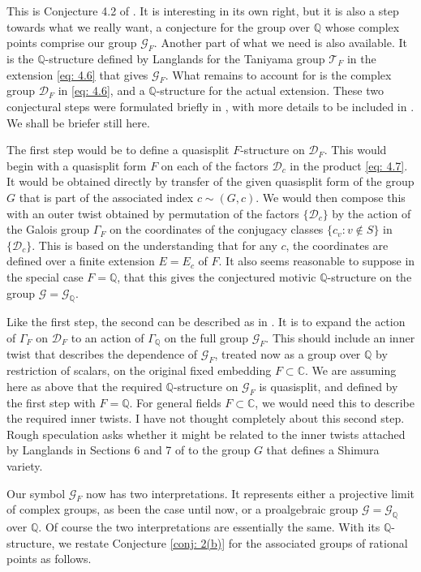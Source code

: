 \documentclass[preprint,12pt, leqno]{elsarticle}
\newcommand{\UGal}{\mathcal{G}_F}
\newcommand{\mQ}{\mathbb{Q}}
\newcommand{\mC}{\mathbb{C}}
\newcommand{\cD}{\mathcal{D}}
\newcommand{\cT}{\mathcal{T}}
\newcommand{\cG}{\mathcal{G}}
\numberwithin{equation}{section}
\theoremstyle{named}
\begin{document}
This is Conjecture 4.2 of \cite{N2}. It is interesting in its own right, but it is also a step towards what we really want, a conjecture for the group over $\mQ$ whose complex points comprise our group $\UGal$. Another part of what we need is also available. It is the $\mQ$-structure defined by Langlands for the Taniyama group $\cT_F$ in the extension \eqref{eq: 4.6} that gives $\UGal$. What remains to account for is the complex group $\cD_F$ in \eqref{eq: 4.6}, and a $\mQ$-structure for the actual extension. These two conjectural steps were formulated briefly in \cite[Section 4]{N2}, with more details to be included in \cite{N14}. We shall be briefer still here.

The first step would be to define a quasisplit $F$-structure on $\cD_F$. This would begin with a quasisplit form $F$ on each of the factors $\cD_c$ in the product \eqref{eq: 4.7}. It would be obtained directly by transfer of the given quasisplit form of the group $G$ that is part of the associated index $c\sim (G, c)$. We would then compose this with an outer twist obtained by permutation of the factors $\{\cD_c\}$ by the action of the Galois group $\Gamma_F$ on the coordinates of the conjugacy classes $\{c_v : v\notin S\}$ in $\{\cD_c\}$. This is based on the understanding that for any $c$, the coordinates are defined over a finite extension $E = E_c$ of $F$. It also seems reasonable to suppose in the special case $F = \mQ$, that this gives the conjectured motivic $\mQ$-structure on the group $\mathcal{G} = \mathcal{G}_{\mQ}$.

Like the first step, the second can be described as in \cite[Section 4]{N2}. It is to expand the action of $\Gamma_F$ on $\cD_F$ to an action of $\Gamma_{\mQ}$ on the full group $\UGal$. This should include an inner twist that describes the dependence of $\UGal$, treated now as a group over $\mQ$ by restriction of scalars,
on the original fixed embedding $F\subset\mC$. We are assuming here as above that the required $\mQ$-structure on $\UGal$ is quasisplit, and defined by the first step with $F = \mQ$. For general fields $F\subset\mC$, we would need this to describe the required inner twists. I have not thought completely about this second step. Rough speculation asks whether it might be related to the inner twists attached by Langlands in Sections 6 and 7 of \cite{L4} to the group $G$ that defines a Shimura variety.

Our symbol $\UGal$ now has two interpretations. It represents either a projective limit of complex groups, as been the case until now, or a proalgebraic group $\cG = \cG_{\mQ}$ over $\mQ$. Of course the two interpretations are essentially the same. With its $\mQ$-structure, we restate Conjecture \ref{conj: 2(b)} for the associated groups of rational points as follows.
\end{document}
